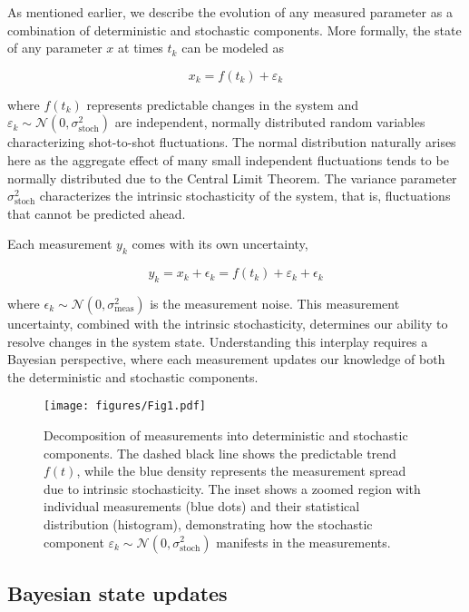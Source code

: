 \documentclass[9pt, twocolumn,superscriptaddress]{revtex4}
\begin{document}
As mentioned earlier, we describe the evolution of any measured parameter as a combination of deterministic and stochastic components. More formally, the state of any parameter $x$ at times $t_k$ can be modeled as


\begin{equation}
    x_k = f(t_k) + \varepsilon_k \label{eq:decomposition}
\end{equation}

where $f(t_k)$ represents predictable changes in the system and $\varepsilon_k \sim \mathcal{N}(0,\sigma^2_\text{stoch})$ are independent, normally distributed random variables characterizing shot-to-shot fluctuations. The normal distribution naturally arises here as the aggregate effect of many small independent fluctuations tends to be normally distributed due to the Central Limit Theorem. The variance parameter $\sigma_\text{stoch}^2$ characterizes the intrinsic stochasticity of the system, that is, fluctuations that cannot be predicted ahead.

Each measurement $y_k$ comes with its own uncertainty,

\begin{equation}
    y_k = x_k + \epsilon_k =  f(t_k) + \varepsilon_k + \epsilon_k 
\end{equation}

where $\epsilon_k \sim \mathcal{N}(0,\sigma^2_\text{meas})$ is the measurement noise. This measurement uncertainty, combined with the intrinsic stochasticity, determines our ability to resolve changes in the system state. Understanding this interplay requires a Bayesian perspective, where each measurement updates our knowledge of both the deterministic and stochastic components.

\begin{figure}[t]
    \centering
    \texttt{[image: figures/Fig1.pdf]}
    \caption{Decomposition of measurements into deterministic and stochastic components. The dashed black line shows the predictable trend $f(t)$, while the blue density represents the measurement spread due to intrinsic stochasticity. The inset shows a zoomed region with individual measurements (blue dots) and their statistical distribution (histogram), demonstrating how the stochastic component $\varepsilon_k \sim \mathcal{N}(0,\sigma^2_\text{stoch})$ manifests in the measurements.}
    \label{fig:decomposition}
\end{figure}

\subsection{Bayesian state updates}\label{sec:Bayes}
\end{document}
